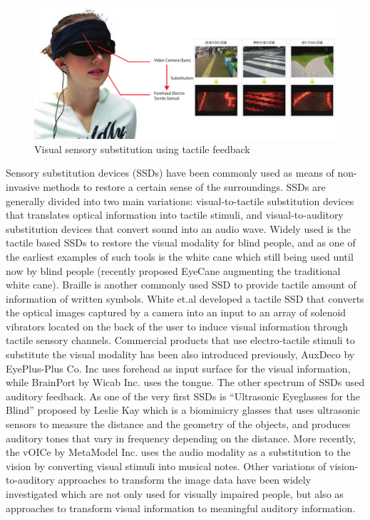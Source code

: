 \begin{figure}[b!]
  \centering
	  \includegraphics[width=1\linewidth]{figures/intro/SSD.pdf}
  \captionsetup{justification=centering}
  \caption{Visual sensory substitution using tactile feedback }
  \label{fig:intro-SSD}
  \text{\footnotesize Photo \copyright\xspace AuxDeco, Inc (modified from original)}
\end{figure}

Sensory substitution devices (SSDs) have been commonly used as means of non-invasive methods to restore a certain sense of the surroundings. SSDs are generally divided into two main variations: visual-to-tactile substitution devices that translates optical information into tactile stimuli, and visual-to-auditory substitution devices that convert sound into an audio wave. Widely used is the tactile based SSDs to restore the visual modality for blind people, and as one of the earliest examples of such tools is the white cane which still being used until now by blind people (recently proposed EyeCane \cite{maidenbaum2014eyecane} augmenting the traditional white cane). Braille is another commonly used SSD to provide tactile amount of information of written symbols. White et.al \cite{white1970seeing} developed a tactile SSD that converts the optical images captured by a camera into an input to an array of solenoid vibrators located on the back of the user to induce visual information through tactile sensory channels. Commercial products that use electro-tactile stimuli to substitute the visual modality has been also introduced previously, AuxDeco by EyePlus-Plus Co. Inc \cite{auxdeco} uses forehead as input surface for the visual information, while BrainPort by Wicab Inc. \cite{brainport} uses the tongue. The other spectrum of SSDs used auditory feedback. As one of the very first SSDs is ``Ultrasonic Eyeglasses for the Blind'' proposed by Leslie Kay \cite{kay1973sonic} which is a biomimicry glasses that uses ultrasonic sensors to measure the distance and the geometry of the objects, and produces auditory tones that vary in frequency depending on the distance. More recently, the vOICe by MetaModel Inc. \cite{vOICe} uses the audio modality as a substitution to the vision by converting visual stimuli into musical notes. Other variations of vision-to-auditory approaches to transform the image data have been widely investigated \cite{meijer1992experimental,capelle1998real,hanneton2010vibe} which are not only used for visually impaired people, but also as approaches to transform visual information to meaningful auditory information.


